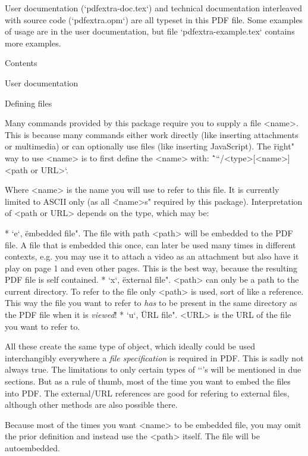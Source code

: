User documentation (`pdfextra-doc.tex`) and technical documentation interleaved
with source code (`pdfextra.opm`) are all typeset in this PDF file. Some
examples of usage are in the user documentation, but file
`pdfextra-example.tex` contains more examples.

\notoc\nonum \sec Contents
\maketoc

\vfil\break

\chap User documentation

\sec Defining files

Many commands provided by this package require you to supply a file <name>. This
is because many commands either work directly (like inserting attachments or
multimedia) or can optionally use files (like inserting JavaScript).
The \"right" way to use <name> is to first define the <name> with:\nl\indent
\^`\filedef``/<type>[<name>]{<path or URL>}`.

Where <name> is the name you will use to refer to this file. It is currently
limited to ASCII only (as all \"<name>s" required by this package).
Interpretation of <path or URL>
depends on the type, which may be:

\begitems
 * `e`, \"embedded file". The file with path <path> will be embedded to the PDF
 file. A file that is embedded this once, can later be used many times in
 different contexts, e.g. you may use it to attach a video as an attachment but
 also have it play on page 1 and even other pages. This is the best way, because
 the resulting PDF file is self contained.
 * `x`, \"external file". <path> can only be a path to the current directory.
 To refer to the file only <path> is used, sort of like a reference. This way
 the file you want to refer to {\em has} to be present in the same directory as
 the PDF file when it is {\em viewed}!
 * `u`, \"URL file". <URL> is the URL of the file you want to refer to.
\enditems

All these create the same type of object, which ideally could be used
interchangibly everywhere a {\em file specification} is required in PDF. This is
sadly not always true. The limitations to only certain types of `\filedef`'s
will be mentioned in due sections. But as a rule of thumb, most of the time you
want to embed the files into PDF. The external/URL references are good for
refering to external files, although other methods are also possible there.

Because most of the times you want <name> to be embedded file, you may omit the
prior definition and instead use the <path> itself. The file will be
autoembedded.

